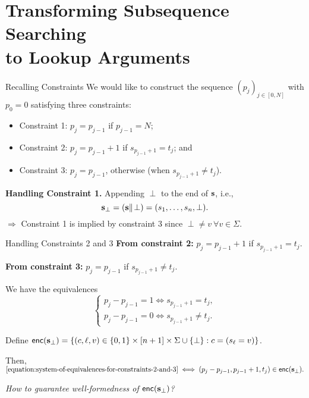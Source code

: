 \section{Transforming Subsequence Searching\\ to Lookup Arguments}
\begin{frame}{Recalling Constraints}
	We would like to construct the sequence $(p_j)_{j \in [0, N]}$ with $p_0 = 0$ satisfying three constraints:
	\begin{itemize}
		\item Constraint 1: $p_j = p_{j - 1}$ if $p_{j - 1} = N$;\\
		\item Constraint 2: $p_j = p_{j - 1} + 1$ if $s_{p_{j - 1} + 1} = t_j$; and\\
		\item Constraint 3: $p_j = p_{j - 1}$, otherwise (when $s_{p_{j - 1} + 1} \not= t_j$).
	\end{itemize}
	
	\textbf{Handling Constraint 1.} Appending $\perp$ to the end of $\mathbf{s}$, i.e.,
	\begin{equation*}
		\mathbf{s}_\perp = (\mathbf{s}\Vert\!\perp) = (s_1, \dots, s_n, \perp).
	\end{equation*}
	$\Rightarrow$ Constraint 1 is implied by constraint 3 since $\perp \not= v~\forall v \in \Sigma$.
\end{frame}
\begin{frame}{Handling Constraints 2 and 3}
	\textbf{From constraint 2:} $p_j = p_{j - 1} + 1$ if $s_{p_{j - 1} + 1} = t_j$.
	
	\textbf{From constraint 3:} $p_j = p_{j - 1}$ if $s_{p_{j - 1} + 1} \not= t_j$.
	
	We have the equivalences
	\begin{equation}\label{equation:system-of-equivalences-for-constraints-2-and-3}
		\begin{cases}
			p_j - p_{j - 1} = 1 \iff s_{p_{j - 1} + 1} = t_j,\\ 
			p_j - p_{j - 1} = 0 \iff s_{p_{j - 1} + 1} \not= t_j.
		\end{cases}
	\end{equation}
	
	Define $\mathsf{enc}(\mathbf{s}_\perp)  = \{(c, \ell, v) \in \{0,1\}\times[n+1]\times\Sigma\cup\{\perp\} : c = (s_\ell = v)\}$.
	
	Then,
	$
		\eqref{equation:system-of-equivalences-for-constraints-2-and-3} \iff (p_j - p_{j - 1}, p_{j - 1} + 1, t_j) \in \mathsf{enc}(\mathbf{s}_\perp).
	$
	
	\pause
	\begin{center}
		\emph{How to guarantee well-formedness of $\mathsf{enc}(\mathbf{s}_\perp)$?}
	\end{center}
\end{frame}

